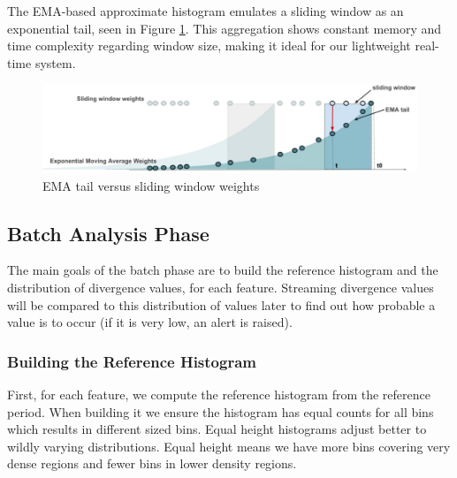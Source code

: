 \documentclass[sigconf]{acmart}
\begin{document}
The EMA-based approximate histogram emulates a sliding window as an exponential tail, seen in Figure \ref{fig:EMA-tail}. This aggregation shows constant memory and time complexity regarding window size, making it ideal for our lightweight real-time system.
\begin{figure}[!htb]
    \begin{center}
      \includegraphics[scale=0.35]{figures/emavswindow.pdf}
      \caption[]{EMA tail versus sliding window weights}
      \label{fig:EMA-tail}
    \end{center}
\end{figure}


\subsection{Batch Analysis Phase} \label{sec:batch-phase}
The main goals of the batch phase are to build the reference histogram and the distribution of divergence values, for each feature. Streaming divergence values will be compared to this distribution of values later to find out how probable a value is to occur (if it is very low, an alert is raised).

\subsubsection{Building the Reference Histogram}
First, for each feature, we compute the reference histogram from the reference period. When building it we ensure the histogram has equal counts for all bins which results in different sized bins. Equal height histograms adjust better to wildly varying distributions. Equal height means we have more bins covering very dense regions and fewer bins in lower density regions. 
\end{document}
